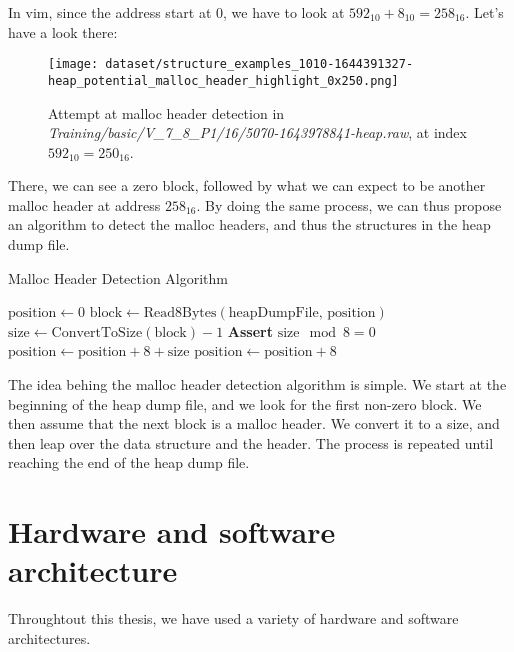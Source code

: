     In vim, since the address start at 0, we have to look at $ 592_{10} + 8_{10} = 258_{16} $. Let's have a look there:

    \begin{figure}[H]
        \centering
        \texttt{[image: dataset/structure\_examples\_1010-1644391327-heap\_potential\_malloc\_header\_highlight\_0x250.png]}
        \caption{Attempt at malloc header detection in \textit{Training/basic/V\_7\_8\_P1/16/5070-1643978841-heap.raw}, at index $ 592_{10} = 250_{16} $.}
    \end{figure}

    There, we can see a zero block, followed by what we can expect to be another malloc header at address $ 258_{16} $. By doing the same process, we can thus propose an algorithm to detect the malloc headers, and thus the structures in the heap dump file.

    \begin{algorithm}[H]
        \caption{Malloc Header Detection Algorithm}
        \begin{algorithmic}[1]
            \State $\text{position} \gets 0$
                \State $\text{block} \gets \text{Read8Bytes}(\text{heapDumpFile, position})$
                    \State $\text{size} \gets \text{ConvertToSize}(\text{block}) - 1$ 
                    \State \textbf{Assert} $ \text{size} \mod 8 = 0$ 
                    \State $\text{position} \gets \text{position} + 8 + \text{size}$ 
                \Else
                    \State $\text{position} \gets \text{position} + 8$
                \EndIf
            \EndWhile
        \EndProcedure
        \end{algorithmic}
    \end{algorithm}

    The idea behing the malloc header detection algorithm is simple. We start at the beginning of the heap dump file, and we look for the first non-zero block. We then assume that the next block is a malloc header. We convert it to a size, and then leap over the data structure and the header. The process is repeated until reaching the end of the heap dump file.

    \section{Hardware and software architecture}
    Throughtout this thesis, we have used a variety of hardware and software architectures. 
    
